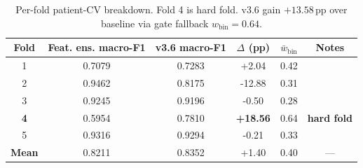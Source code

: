 \begin{table}[t]
\centering
\small
\caption{Per-fold patient-CV breakdown. Fold 4 is hard fold. v3.6 gain $+13.58$\,pp over baseline via gate fallback $w_\mathrm{bin}=0.64$.}
\label{tab:per_fold_breakdown}
\begin{tabular}{cccccc}
\toprule
\textbf{Fold} & \textbf{Feat. ens. macro-F1} & \textbf{v3.6 macro-F1} & \textbf{$\Delta$ (pp)} & \textbf{$\bar{w}_\mathrm{bin}$} & \textbf{Notes} \\
\midrule
1 & 0.7079 & 0.7283 & +2.04 & 0.42 &  \\
2 & 0.9462 & 0.8175 & -12.88 & 0.31 &  \\
3 & 0.9245 & 0.9196 & -0.50 & 0.28 &  \\
\textbf{4} & 0.5954 & 0.7810 & \textbf{+18.56} & 0.64 & \textbf{hard fold} \\
5 & 0.9316 & 0.9294 & -0.21 & 0.33 &  \\
\midrule
\textbf{Mean} & 0.8211 & 0.8352 & +1.40 & 0.40 & — \\
\bottomrule
\end{tabular}
\end{table}

